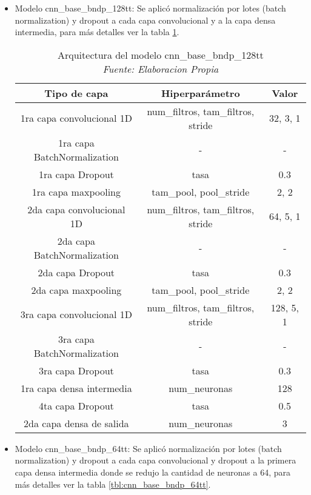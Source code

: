\begin{itemize}
	
	\item Modelo cnn\_base\_bndp\_128tt: Se aplicó normalización por lotes (batch normalization) y dropout a cada capa convolucional y a la capa densa intermedia, para más detalles ver la tabla \ref{tbl:cnn_base_bndp_128tt}.
	
	\begin{table}[!ht]
		\centering
		\begin{tabular}{|c|c|c|}
			\hline
			\textbf{Tipo de capa} & \textbf{Hiperparámetro} & \textbf{Valor} \\ \hline
			1ra capa convolucional 1D & num\_filtros, tam\_filtros, stride & 32, 3, 1 \\ \hline
			1ra capa BatchNormalization & - & - \\ \hline
			1ra capa Dropout & tasa & 0.3 \\ \hline
			1ra capa maxpooling & tam\_pool, pool\_stride & 2, 2 \\ \hline
			2da capa convolucional 1D & num\_filtros, tam\_filtros, stride & 64, 5, 1 \\ \hline
			2da capa BatchNormalization & - & - \\ \hline
			2da capa Dropout & tasa & 0.3 \\ \hline
			2da capa maxpooling & tam\_pool, pool\_stride & 2, 2 \\ \hline
			3ra capa convolucional 1D & num\_filtros, tam\_filtros, stride & 128, 5, 1 \\ \hline
			3ra capa BatchNormalization & - & - \\ \hline
			3ra capa Dropout & tasa & 0.3 \\ \hline
			1ra capa densa intermedia & num\_neuronas & 128 \\ \hline
			4ta capa Dropout & tasa & 0.5 \\ \hline
			2da capa densa de salida & num\_neuronas & 3 \\ \hline
		\end{tabular}
		\caption[Arquitectura del modelo cnn\_base\_bndp\_128tt]{Arquitectura del modelo cnn\_base\_bndp\_128tt
			\\\textit{Fuente: Elaboracion Propia}}
		\label{tbl:cnn_base_bndp_128tt}
	\end{table}
	
	
	\item Modelo cnn\_base\_bndp\_64tt: Se aplicó normalización por lotes (batch normalization) y dropout a cada capa convolucional y dropout a la primera capa densa intermedia donde se redujo la cantidad de neuronas a 64, para más detalles ver la tabla \ref{tbl:cnn_base_bndp_64tt}.
	

\end{itemize}
